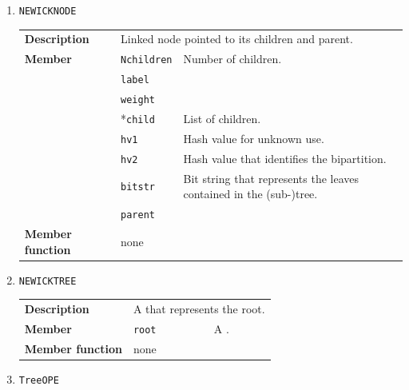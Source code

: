 \documentclass[11pt,a4paper]{article}
\newcommand{\myuline}[1]{%
	\uline{\phantom{#1}}%
	\llap{\contour{white}{#1}}%
}
\newcommand{\mrref}[1]{\texttt{#1}\label{#1}}
\newcommand{\mmemref}[2]{\texttt{#1}\label{#2#1}}
\newcommand{\rref}[1]{\hyperref[#1]{\textcolor{blue}{\myuline{\texttt{#1}}}}}
\theoremstyle{definition}
\theoremstyle{definition}
\numberwithin{equation}{section}
\begin{document}
\begin{enumerate}
		\item \mrref{NEWICKNODE}
		
			\begin{tabular}{>{\bfseries}lp{}p{}}
				Description & \multicolumn{2}{p{0.6\textwidth}}{Linked node pointed to its children and parent.} \\
				Member & \mmemref{Nchildren}{NEWICKNODE}  & Number of children.\\
				& \mmemref{label}{NEWICKNODE} &\\
				& \mmemref{weight}{NEWICKNODE} &\\
				& *\mmemref{child}{NEWICKNODE} & List of children.\\
				& \mmemref{hv1}{NEWICKNODE} & Hash value for unknown use.\\
				& \mmemref{hv2}{NEWICKNODE} & Hash value that identifies the bipartition.\\
				& \mmemref{bitstr}{NEWICKNODE} & Bit string that represents the leaves contained in the (sub-)tree.\\
				& \mmemref{parent}{NEWICKNODE} & \\
				Member function& none  &  \\
			\end{tabular}

		
		\item \mrref{NEWICKTREE}
		
			\begin{tabular}{>{\bfseries}lp{}p{}}
				Description & \multicolumn{2}{p{0.6\textwidth}}{A \rref{NEWICKNODE} that represents the root.} \\
				Member & \mmemref{root}{NEWICKTREE}  & A \rref{NEWICKNODE}.\\
				Member function& none  &  \\
			\end{tabular}

		
		\item \mrref{TreeOPE}
		

\end{enumerate}
\end{document}
